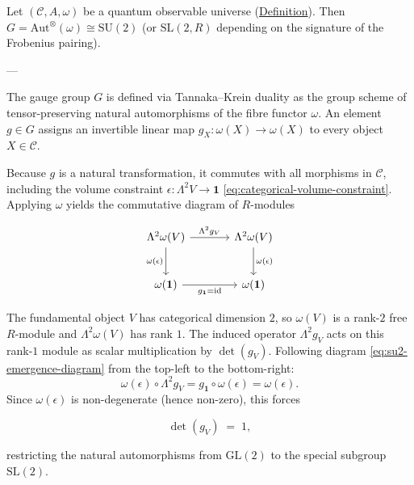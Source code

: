 \begin{theorem}
  \label{thm:su2-emergence}
Let $(\mathcal{C}, A, \omega)$ be a quantum observable universe
(\hyperref[def:quantum-observable-universe]{Definition}). Then
$G = \mathrm{Aut}^{\otimes}(\omega) \cong \mathrm{SU}(2)$
(or $\mathrm{SL}(2, R)$ depending on the signature of the Frobenius
pairing).

---

The gauge group $G$ is defined via Tannaka--Krein duality as
the group scheme of tensor-preserving natural automorphisms of the fibre
functor $\omega$. An element $g \in G$ assigns an invertible linear map
$g_X \colon \omega(X) \to \omega(X)$ to every object $X \in \mathcal{C}$.

Because $g$ is a natural transformation, it commutes with all morphisms
in $\mathcal{C}$, including the volume constraint
$\epsilon \colon \Lambda^2 V \to \mathbf{1}$
\eqref{eq:categorical-volume-constraint}. Applying $\omega$ yields the
commutative diagram of $R$-modules

\begin{equation}\label{eq:su2-emergence-diagram}
\begin{tikzcd}[row sep=2.5em, column sep=3.5em]
  \Lambda^2 \omega(V)
    \ar[r, "\Lambda^2 g_V"]
    \ar[d, "\omega(\epsilon)"']
  & \Lambda^2 \omega(V)
    \ar[d, "\omega(\epsilon)"]
  \\
  \omega(\mathbf{1})
    \ar[r, "g_{\mathbf{1}} = \mathrm{id}"']
  & \omega(\mathbf{1})
\end{tikzcd}
\end{equation}

The fundamental object $V$ has categorical dimension $2$, so
$\omega(V)$ is a rank-$2$ free $R$-module and $\Lambda^2 \omega(V)$ has
rank $1$. The induced operator $\Lambda^2 g_V$ acts on this rank-$1$
module as scalar multiplication by $\det(g_V)$. Following
diagram \eqref{eq:su2-emergence-diagram} from the top-left to the
bottom-right:
\[
\omega(\epsilon) \circ \Lambda^2 g_V
  =
  g_{\mathbf{1}} \circ \omega(\epsilon)
  =
  \omega(\epsilon).
\]
Since $\omega(\epsilon)$ is non-degenerate (hence non-zero), this forces

\begin{equation}\label{eq:det-one}
  \det(g_V) \;=\; 1,
\end{equation}

restricting the natural automorphisms from $\mathrm{GL}(2)$ to the
special subgroup $\mathrm{SL}(2)$.


\end{theorem}
